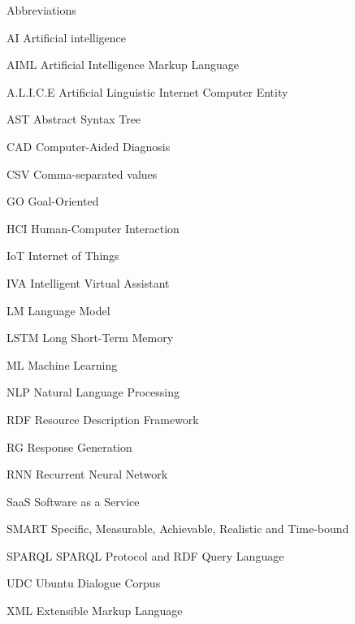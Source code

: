 \begin{dictionary}{Abbreviations}
\item[AI]			Artificial intelligence
\item[AIML]			Artificial Intelligence Markup Language
\item[A.L.I.C.E]	Artificial Linguistic Internet Computer Entity
\item[AST]			Abstract Syntax Tree
\item[CAD]			Computer-Aided Diagnosis
\item[CSV]			Comma-separated values
\item[GO]			Goal-Oriented
\item[HCI]			Human-Computer Interaction
\item[IoT]			Internet of Things
\item[IVA]			Intelligent Virtual Assistant
\item[LM]			Language Model
\item[LSTM]			Long Short-Term Memory
\item[ML]			Machine Learning
\item[NLP]			Natural Language Processing
\item[RDF]			Resource Description Framework
\item[RG]			Response Generation
\item[RNN]			Recurrent Neural Network
\item[SaaS]			Software as a Service
\item[SMART]		Specific, Measurable, Achievable, Realistic and Time-bound
\item[SPARQL]		SPARQL Protocol and RDF Query Language
\item[UDC]			Ubuntu Dialogue Corpus
\item[XML]			Extensible Markup Language

\end{dictionary}